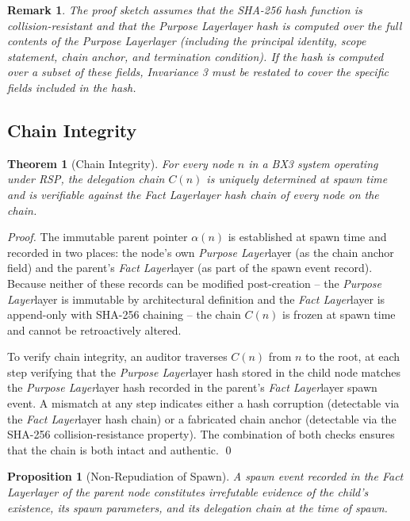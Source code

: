 \documentclass[12pt]{article}
\newtheorem{thrm}[section]{Theorem}
\newtheorem{prop}[section]{Proposition}
\newtheorem{rem}[section]{Remark}
\def\purpose{\textit{Purpose Layer}}
\def\fact{\textit{Fact Layer}}
\begin{document}
\begin{rem}
The proof sketch assumes that the SHA-256 hash function is collision-resistant and that the \purpose layer hash is computed over the full contents of the \purpose layer (including the principal identity, scope statement, chain anchor, and termination condition). If the hash is computed over a subset of these fields, Invariance 3 must be restated to cover the specific fields included in the hash.
\end{rem}

\subsection{Chain Integrity}

\begin{thrm}[Chain Integrity]
\label{thrm:chain-integrity}
For every node $n$ in a BX3 system operating under RSP, the delegation chain $C(n)$ is uniquely determined at spawn time and is verifiable against the \fact layer hash chain of every node on the chain.
\end{thrm}

\begin{proof}
The immutable parent pointer $\alpha(n)$ is established at spawn time and recorded in two places: the node's own \purpose layer (as the chain anchor field) and the parent's \fact layer (as part of the spawn event record). Because neither of these records can be modified post-creation -- the \purpose layer is immutable by architectural definition and the \fact layer is append-only with SHA-256 chaining -- the chain $C(n)$ is frozen at spawn time and cannot be retroactively altered.

To verify chain integrity, an auditor traverses $C(n)$ from $n$ to the root, at each step verifying that the \purpose layer hash stored in the child node matches the \purpose layer hash recorded in the parent's \fact layer spawn event. A mismatch at any step indicates either a hash corruption (detectable via the \fact layer hash chain) or a fabricated chain anchor (detectable via the SHA-256 collision-resistance property). The combination of both checks ensures that the chain is both intact and authentic. \qed
\end{proof}

\begin{prop}[Non-Repudiation of Spawn]
\label{prop:non-repudiation}
A spawn event recorded in the \fact layer of the parent node constitutes irrefutable evidence of the child's existence, its spawn parameters, and its delegation chain at the time of spawn.
\end{prop}
\end{document}
